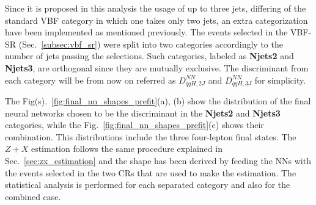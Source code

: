Since it is proposed in this analysis the usage of up to three jets, differing of the standard VBF category in which one takes only two jets, an extra categorization have been implemented as mentioned previously. The events selected in the VBF-SR (Sec.~\ref{subsec:vbf_sr}) were split into two categories accordingly to the number of jets passing the selections. Such categories, labeled as \textbf{Njets2} and \textbf{Njets3}, are orthogonal since they are mutually exclusive. The discriminant from each category will be from now on referred as $D_{qqH,2J}^{NN}$ and $D_{qqH,3J}^{NN}$ for simplicity.

The Fig(s).~\ref{fig:final_nn_shapes_prefit}(a), (b) show the distribution of the final neural networks chosen to be the discriminant in the \textbf{Njets2} and \textbf{Njets3} categories, while the Fig.~\ref{fig:final_nn_shapes_prefit}(c) shows their combination. This distributions include the three four-lepton final states. The $Z+X$ estimation follows the same procedure explained in Sec.~\ref{sec:zx_estimation} and the shape has been derived by feeding the NNs with the events selected in the two CRs that are used to make the estimation. The statistical analysis is performed for each separated category and also for the combined case.

